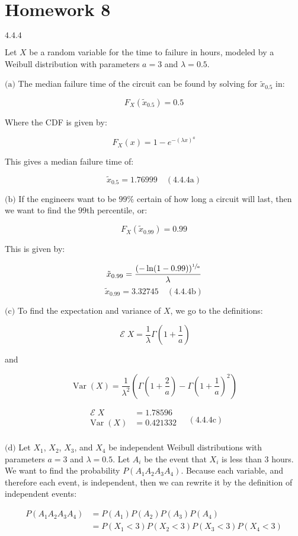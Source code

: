 \documentclass{article}
\newcommand{\problem}[2]{$\boxed{\text{#1.#2}}$}
\newcommand{\subproblem}[3]{$\boxed{\text{(#3)}}$}
\newcommand{\subsolution}[4]{\boxed{#4\quad(\text{#1.#2#3})}}
\newcommand{\multistep}[1]{\begin{array}{rl} #1 \end{array}}
\DeclareMathOperator{\var}{Var}
\DeclareMathOperator{\E}{\mathcal{E}}
\begin{document}
\section*{Homework 8}

%
\problem{4.4}{4}

Let $X$ be a random variable for the time to failure in hours, modeled
by a Weibull distribution with parameters $a=3$ and $\lambda=0.5$.

%
\subproblem{4.4}{4}{a} The median failure time of the circuit can be
found by solving for $\tilde{x}_{0.5}$ in:

\[
F_X(\tilde{x}_{0.5})=0.5
\]

Where the CDF is given by:

\[
F_X(x)=1-e^{-(\lambda x)^a}
\]

This gives a median failure time of:

\[
\subsolution{4.4}{4}{a}{\tilde{x}_{0.5}=1.76999}
\]

%
\subproblem{4.4}{4}{b} If the engineers want to be $99\%$ certain of
how long a circuit will last, then we want to find the $99$th
percentile, or:

\[
F_X(\tilde{x}_{0.99})=0.99
\]

This is given by:

\[
\tilde{x}_{0.99}=\dfrac{(-\ln(1-0.99))^{\sfrac{1}{a}}}{\lambda}
\] \[
\subsolution{4.4}{4}{b}{\tilde{x}_{0.99}=3.32745}
\]

%
\subproblem{4.4}{4}{c} To find the expectation and variance of $X$, we
go to the definitions:

\[
\E X=\frac{1}{\lambda} \Gamma\left(1+\frac{1}{a}\right)
\]

and

\[
\var(X)=\frac{1}{\lambda^2}\left(\Gamma\left(1+\frac{2}{a}\right)-\Gamma\left(1+\frac{1}{a}\right)^2\right)
\]

\[
\subsolution{4.4}{4}{c}{\multistep{
\E X&= 1.78596 \\
\var(X)&= 0.421332 \\
}}
\]

%
\subproblem{4.4}{4}{d} Let $X_1$, $X_2$, $X_3$, and $X_4$ be
independent Weibull distributions with parameters $a=3$ and
$\lambda=0.5$. Let $A_i$ be the event that $X_i$ is less than 3
hours. We want to find the probability $P(A_1A_2A_3A_4)$. Because each
variable, and therefore each event, is independent, then we can
rewrite it by the definition of independent events:

\[
\multistep{
P(A_1A_2A_3A_4)&=P(A_1)P(A_2)P(A_3)P(A_4) \\
&=P(X_1<3)P(X_2<3)P(X_3<3)P(X_4<3) \\
}
\]
\end{document}
